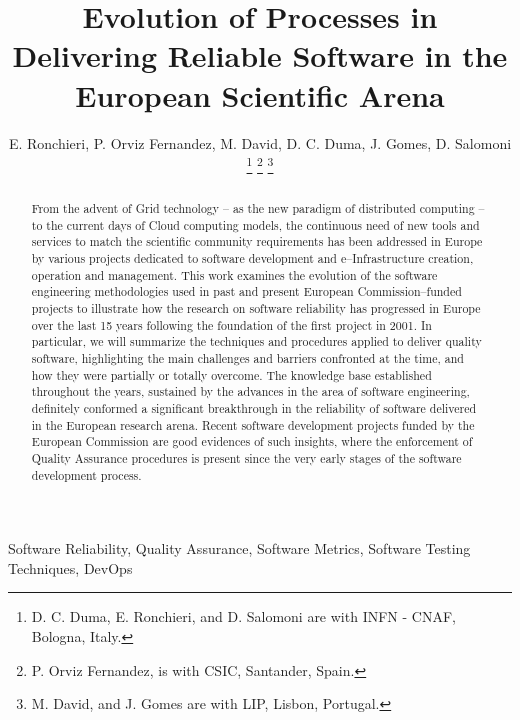 \documentclass[journal]{IEEEtran}
\begin{document}
\title{Evolution of Processes in Delivering Reliable Software in the European Scientific Arena}

\author{E. Ronchieri,
        P. Orviz Fernandez,
        M. David,
        D. C. Duma,
        J. Gomes,
        D. Salomoni
\thanks{D. C. Duma, E. Ronchieri, and D. Salomoni are with INFN - CNAF, Bologna, Italy.}
\thanks{P. Orviz Fernandez, is with CSIC, Santander, Spain.}
\thanks{M. David, and J. Gomes are with LIP, Lisbon, Portugal.}%
}

\maketitle

\begin{abstract}

From the advent of Grid technology -- as the new paradigm of distributed
computing -- to the current days of Cloud computing models, the continuous need
of new tools and services to match the scientific community requirements has been
addressed in Europe by various projects dedicated to software development
and e--Infrastructure creation, operation and management.
This work examines the evolution of the software engineering methodologies used in past and
present European Commission--funded projects to illustrate how the research on software
reliability has progressed in Europe over the last 15 years following the foundation of the
first project in 2001. In particular, we will summarize the techniques and procedures
applied to deliver quality software, highlighting the main challenges and barriers confronted
at the time, and how they were partially or totally overcome. The knowledge base established
throughout the years, sustained by the advances in the area of software engineering,
definitely conformed a significant breakthrough in the reliability of software delivered in the
European research arena. Recent software development projects funded by the European
Commission are good evidences of such insights, where the enforcement of Quality Assurance
procedures is present since the very early stages of the software development process.

\end{abstract}

\begin{IEEEkeywords}
Software Reliability, Quality Assurance, Software Metrics, Software Testing
Techniques, DevOps
\end{IEEEkeywords}

\IEEEpeerreviewmaketitle
\end{document}
